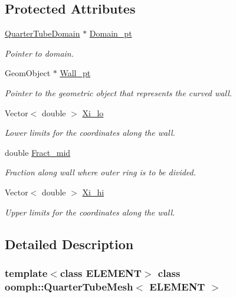 \subsection*{Protected Attributes}
\begin{DoxyCompactItemize}
\item 
\hyperlink{classoomph_1_1QuarterTubeDomain}{Quarter\+Tube\+Domain} $\ast$ \hyperlink{classoomph_1_1QuarterTubeMesh_a250577dc1d699b4035a42ddabd84c121}{Domain\+\_\+pt}
\begin{DoxyCompactList}\small\item\em Pointer to domain. \end{DoxyCompactList}\item 
Geom\+Object $\ast$ \hyperlink{classoomph_1_1QuarterTubeMesh_a961bf18652514913c6a63c4850088e8b}{Wall\+\_\+pt}
\begin{DoxyCompactList}\small\item\em Pointer to the geometric object that represents the curved wall. \end{DoxyCompactList}\item 
Vector$<$ double $>$ \hyperlink{classoomph_1_1QuarterTubeMesh_a323243990ecc860e5083d205c1ab247c}{Xi\+\_\+lo}
\begin{DoxyCompactList}\small\item\em Lower limits for the coordinates along the wall. \end{DoxyCompactList}\item 
double \hyperlink{classoomph_1_1QuarterTubeMesh_ac7422bd566e566fd901bbbc98d8cb3b7}{Fract\+\_\+mid}
\begin{DoxyCompactList}\small\item\em Fraction along wall where outer ring is to be divided. \end{DoxyCompactList}\item 
Vector$<$ double $>$ \hyperlink{classoomph_1_1QuarterTubeMesh_aabb226a0b0208c579f426e58d944685c}{Xi\+\_\+hi}
\begin{DoxyCompactList}\small\item\em Upper limits for the coordinates along the wall. \end{DoxyCompactList}\end{DoxyCompactItemize}


\subsection{Detailed Description}
\subsubsection*{template$<$class E\+L\+E\+M\+E\+NT$>$\newline
class oomph\+::\+Quarter\+Tube\+Mesh$<$ E\+L\+E\+M\+E\+N\+T $>$}

